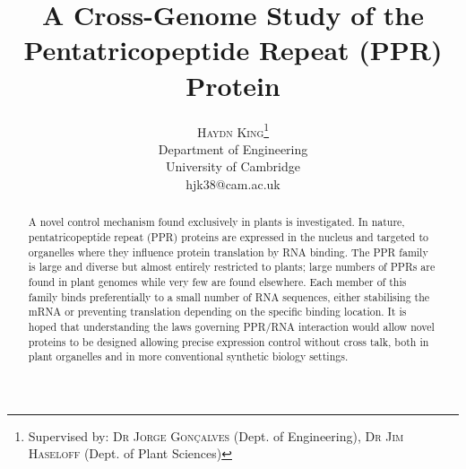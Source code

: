 \documentclass[twoside,a4paper]{article}
\title{\vspace{-15mm}\fontsize{24pt}{10pt}\selectfont\textbf{A Cross-Genome
Study of the Pentatricopeptide Repeat (PPR) Protein}} %
\author{
\large
\textsc{Haydn King}\thanks{Supervised by: \textsc{Dr Jorge Gon\c{c}alves} 
(Dept. of Engineering), \textsc{Dr Jim Haseloff} 
(Dept. of Plant Sciences)}\\[2mm] %
\normalsize Department of Engineering \\
\normalsize University of Cambridge \\ %
\normalsize hjk38@cam.ac.uk %
\vspace{-5mm}
}
\date{}
\begin{document}
\maketitle %

\thispagestyle{fancy} %


\begin{abstract}

\noindent A novel control mechanism found exclusively in plants is
investigated. 
In nature, pentatricopeptide repeat (PPR) proteins are expressed in the nucleus
and targeted to organelles where they influence protein translation by RNA
binding.
The PPR family is large and diverse but almost entirely restricted to plants; 
large numbers of PPRs are found in plant genomes while very few are found
elsewhere.
Each member of this family binds preferentially to a small number of RNA
sequences, either stabilising the mRNA or preventing translation depending on
the specific binding location.
It is hoped that understanding the laws governing PPR/RNA interaction would
allow novel proteins to be designed allowing precise expression control without
cross talk, both in plant organelles and in more conventional synthetic biology
settings.

\end{abstract}

\end{document}
